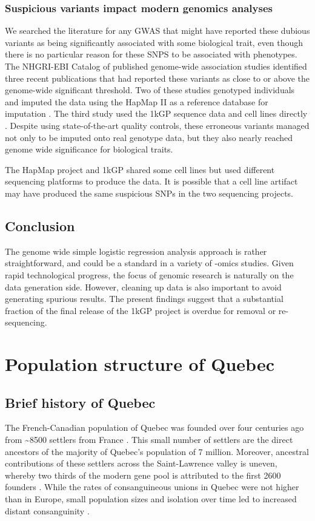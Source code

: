 \documentclass[
11pt, %
oneside, %
english, %
doublespacing, %
headsepline, %
chapterinoneline, %
]{MastersDoctoralThesis} %
\begin{document}
\subsection{Suspicious variants impact modern genomics analyses}
We searched the literature for any GWAS that might have reported these dubious variants as being significantly associated with some biological trait, even though there is no particular reason for these SNPS to be associated with phenotypes.
The NHGRI-EBI Catalog of published genome-wide association studies identified three recent publications that had reported these variants as close to or above the genome-wide significant threshold.
Two of these studies genotyped individuals and imputed the data using the HapMap II as a reference  database for imputation \citep{Kraja2011, Ebejer2013}.
The third study used the 1kGP sequence data and cell lines directly \citep{Mandage2017}.
Despite using state-of-the-art quality controls, these erroneous variants managed not only to be imputed onto real genotype data, but they also nearly reached genome wide significance for biological traits.

The HapMap project and 1kGP shared some cell lines but used different sequencing platforms to produce the data.
It is possible that a cell line artifact may have produced the same suspicious SNPs in the two sequencing projects.

\section{Conclusion}
The genome wide simple logistic regression analysis approach is rather straightforward, and could be a standard in a variety of -omics studies.
Given rapid technological progress, the focus of genomic research is naturally on the data generation side. 
However, cleaning up data is also important to avoid generating spurious results. 
The present findings suggest that a substantial fraction of the final release of the 1kGP project is overdue for removal or re-sequencing. 
\vfill

\chapter{Population structure of Quebec}

\section{Brief history of Quebec}
The French-Canadian population of Quebec was founded over four centuries ago from \textasciitilde 8500 settlers from France \citep{Bherer2011,Laberge2005}.
This small number of settlers are the direct ancestors of the majority of Quebec's population of 7 million.
Moreover, ancestral contributions of these settlers across the Saint-Lawrence valley is uneven, whereby two thirds of the modern gene pool is attributed to the first 2600 founders \citep{Gagnon2001, Laberge2005}.
While the rates of consanguineous unions in Quebec were not higher than in Europe, small population sizes and isolation over time led to increased distant consanguinity \citep{Laberge2005}.
\end{document}
